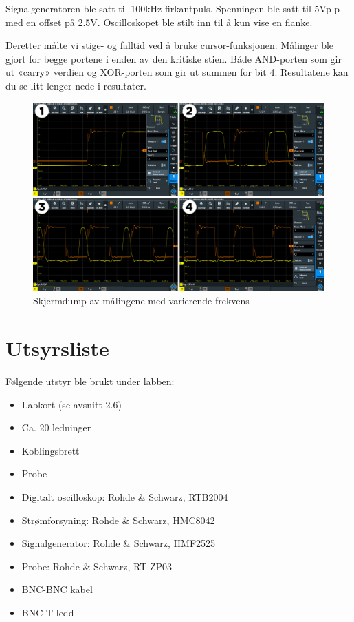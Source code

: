 \documentclass{article}
\begin{document}
Signalgeneratoren ble satt til 100kHz firkantpuls. Spenningen ble satt til 5Vp-p med en offset på 2.5V.  Oscilloskopet ble stilt inn til å kun vise en flanke.

Deretter målte vi stige- og falltid ved å bruke cursor-funksjonen. Målinger ble gjort for begge portene i enden av den kritiske stien. Både AND-porten som gir ut «carry» verdien og XOR-porten som gir ut summen for bit 4. Resultatene kan du se litt lenger nede i resultater.

\begin{figure}[H]
	\centering
	\includegraphics[width=1\linewidth]{tegneserie1}
	\caption{Skjermdump av målingene med varierende frekvens}
	\label{fig:tegneserie1}
\end{figure}


\section{Utsyrsliste}
Følgende utstyr ble brukt under labben:
\begin{itemize}
	\item Labkort (se avsnitt 2.6)
	\item Ca. 20 ledninger
	\item Koblingsbrett
	\item Probe
	\item Digitalt oscilloskop: Rohde \& Schwarz, RTB2004
	\item Strømforsyning: Rohde \& Schwarz, HMC8042
	\item Signalgenerator: Rohde \& Schwarz, HMF2525
	\item Probe: Rohde \& Schwarz, RT-ZP03
	\item BNC-BNC kabel
	\item BNC T-ledd
\end{itemize}
\end{document}
